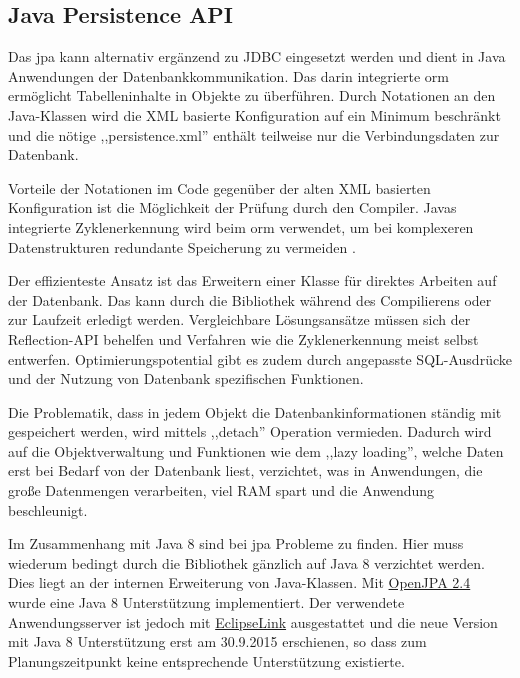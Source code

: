 \documentclass[oneside, ngerman, toc=bibliography,bibliography=totoc,listof=entryprefix, open=right,numbers=noenddot,fontsize=12pt]{scrbook}
\begin{document}
\subsection{Java Persistence API}
\label{chap:jpa}

Das \acrfull{jpa} kann alternativ ergänzend zu {JDBC} eingesetzt werden und dient in Java Anwendungen der Datenbankkommunikation. Das darin integrierte \acrfull{orm} ermöglicht Tabelleninhalte in Objekte zu überführen. Durch Notationen an den Java-Klassen wird die XML basierte Konfiguration auf ein Minimum beschränkt und die nötige ,,persistence.xml'' enthält teilweise nur die Verbindungsdaten zur Datenbank.

Vorteile der Notationen im Code gegenüber der alten {XML} basierten Konfiguration ist die Möglichkeit der Prüfung durch den Compiler. Javas integrierte Zyklenerkennung wird beim \acrshort{orm} verwendet, um bei komplexeren Datenstrukturen redundante Speicherung zu vermeiden \cite{inden2012weg}.


Der effizienteste Ansatz ist das Erweitern einer Klasse für direktes Arbeiten auf der Datenbank. Das kann durch die Bibliothek während des Compilierens oder zur Laufzeit erledigt werden. Vergleichbare  Lösungsansätze müssen sich der Reflection-API behelfen und Verfahren wie die Zyklenerkennung meist selbst entwerfen.
Optimierungspotential gibt es zudem durch angepasste SQL-Ausdrücke und der Nutzung von Datenbank spezifischen Funktionen.

Die Problematik, dass in jedem Objekt die Datenbankinformationen ständig mit gespeichert werden, wird mittels {,,detach''} Operation vermieden. Dadurch wird auf die Objektverwaltung und Funktionen wie dem ,,lazy loading'', welche Daten erst bei Bedarf von der Datenbank liest, verzichtet, was in Anwendungen, die große Datenmengen verarbeiten, viel RAM spart und die Anwendung beschleunigt.

Im  Zusammenhang mit Java 8 sind bei \acrshort{jpa} Probleme zu finden. Hier muss wiederum bedingt durch die Bibliothek gänzlich auf Java 8 verzichtet werden.
Dies liegt an der internen Erweiterung von Java-Klassen. Mit \href{http://openjpa.apache.org/openjpa-2.4.x.html}{OpenJPA 2.4} wurde eine Java 8 Unterstützung implementiert. Der verwendete Anwendungsserver ist jedoch mit \href{http://www.eclipse.org/eclipselink/}{EclipseLink} ausgestattet und die neue Version mit Java 8 Unterstützung erst am 30.9.2015 erschienen, so dass zum Planungszeitpunkt keine entsprechende Unterstützung existierte.
\end{document}
